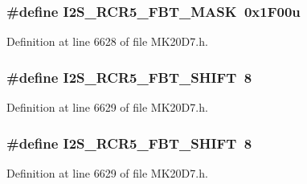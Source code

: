 \subsubsection[{\texorpdfstring{I2\+S\+\_\+\+R\+C\+R5\+\_\+\+F\+B\+T\+\_\+\+M\+A\+SK}{I2S_RCR5_FBT_MASK}}]{\setlength{\rightskip}{0pt plus 5cm}\#define I2\+S\+\_\+\+R\+C\+R5\+\_\+\+F\+B\+T\+\_\+\+M\+A\+SK~0x1\+F00u}\hypertarget{group___i2_s___register___masks_ga54847f1139b421f0f0df7af775a11996}{}\label{group___i2_s___register___masks_ga54847f1139b421f0f0df7af775a11996}


Definition at line 6628 of file M\+K20\+D7.\+h.

\subsubsection[{\texorpdfstring{I2\+S\+\_\+\+R\+C\+R5\+\_\+\+F\+B\+T\+\_\+\+S\+H\+I\+FT}{I2S_RCR5_FBT_SHIFT}}]{\setlength{\rightskip}{0pt plus 5cm}\#define I2\+S\+\_\+\+R\+C\+R5\+\_\+\+F\+B\+T\+\_\+\+S\+H\+I\+FT~8}\hypertarget{group___i2_s___register___masks_gabe8f4784a8f4ce3235e31483d0b6e5f4}{}\label{group___i2_s___register___masks_gabe8f4784a8f4ce3235e31483d0b6e5f4}


Definition at line 6629 of file M\+K20\+D7.\+h.

\subsubsection[{\texorpdfstring{I2\+S\+\_\+\+R\+C\+R5\+\_\+\+F\+B\+T\+\_\+\+S\+H\+I\+FT}{I2S_RCR5_FBT_SHIFT}}]{\setlength{\rightskip}{0pt plus 5cm}\#define I2\+S\+\_\+\+R\+C\+R5\+\_\+\+F\+B\+T\+\_\+\+S\+H\+I\+FT~8}\hypertarget{group___i2_s___register___masks_gabe8f4784a8f4ce3235e31483d0b6e5f4}{}\label{group___i2_s___register___masks_gabe8f4784a8f4ce3235e31483d0b6e5f4}


Definition at line 6629 of file M\+K20\+D7.\+h.

